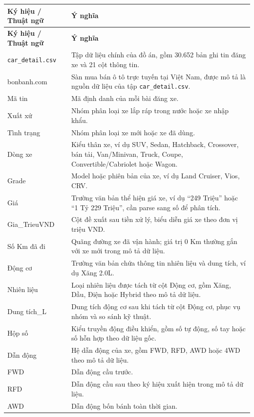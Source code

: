 \begin{longtable}{L{0.28\textwidth} L{0.62\textwidth}}
\textbf{Ký hiệu / Thuật ngữ} & \textbf{Ý nghĩa} \\
\hline
\endfirsthead
\textbf{Ký hiệu / Thuật ngữ} & \textbf{Ý nghĩa} \\
\hline
\endhead

\texttt{car\_detail.csv} & Tập dữ liệu chính của đồ án, gồm 30.652 bản ghi tin đăng xe và 21 cột thông tin. \\
bonbanh.com & Sàn mua bán ô tô trực tuyến tại Việt Nam, được mô tả là nguồn dữ liệu của tập \texttt{car\_detail.csv}. \\
Mã tin & Mã định danh của mỗi bài đăng xe. \\
Xuất xứ & Nhóm phân loại xe lắp ráp trong nước hoặc xe nhập khẩu. \\
Tình trạng & Nhóm phân loại xe mới hoặc xe đã dùng. \\
Dòng xe & Kiểu thân xe, ví dụ SUV, Sedan, Hatchback, Crossover, bán tải, Van/Minivan, Truck, Coupe, Convertible/Cabriolet hoặc Wagon. \\
Grade & Model hoặc phiên bản của xe, ví dụ Land Cruiser, Vios, CRV. \\
Giá & Trường văn bản thể hiện giá xe, ví dụ ``249 Triệu'' hoặc ``1 Tỷ 229 Triệu'', cần parse sang số để phân tích. \\
Gia\_TrieuVND & Cột đề xuất sau tiền xử lý, biểu diễn giá xe theo đơn vị triệu VND. \\
Số Km đã đi & Quãng đường xe đã vận hành; giá trị 0 Km thường gắn với xe mới trong mô tả dữ liệu. \\
Động cơ & Trường văn bản chứa thông tin nhiên liệu và dung tích, ví dụ Xăng 2.0L. \\
Nhiên liệu & Loại nhiên liệu được tách từ cột Động cơ, gồm Xăng, Dầu, Điện hoặc Hybrid theo mô tả dữ liệu. \\
Dung tích\_L & Dung tích động cơ sau khi tách từ cột Động cơ, phục vụ nhóm và so sánh kỹ thuật. \\
Hộp số & Kiểu truyền động điều khiển, gồm số tự động, số tay hoặc số hỗn hợp theo dữ liệu gốc. \\
Dẫn động & Hệ dẫn động của xe, gồm FWD, RFD, AWD hoặc 4WD theo mô tả dữ liệu. \\
FWD & Dẫn động cầu trước. \\
RFD & Dẫn động cầu sau theo ký hiệu xuất hiện trong mô tả dữ liệu. \\
AWD & Dẫn động bốn bánh toàn thời gian. \\

\end{longtable}
